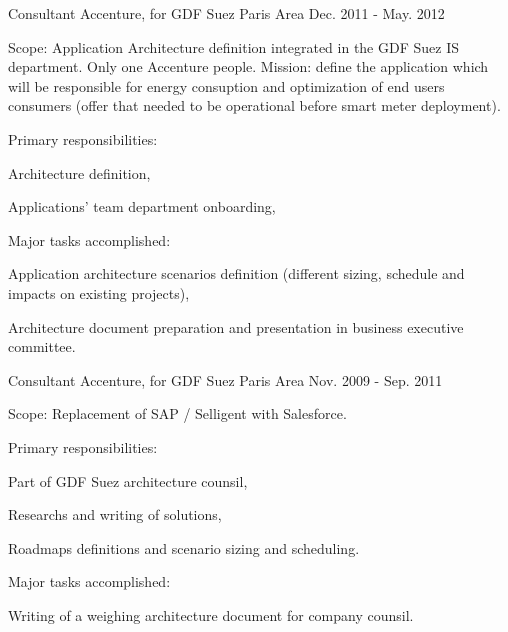 \begin{cventries}
  \cventry
    {Consultant} %
    {Accenture, for GDF Suez} %
    {Paris Area} %
    {Dec. 2011 - May. 2012} %
    {
      \begin{cvitems} %
        \item {Scope: Application Architecture definition integrated in the GDF Suez IS department. Only one Accenture people. Mission: define the application which will be responsible for energy consuption and optimization of end users consumers (offer that needed to be operational before smart meter deployment).}
        \item {Primary responsibilities:}
        \begin{cvsubitems}
          \item {Architecture definition,}
          \item {Applications' team department onboarding,}
        \end{cvsubitems}
        \item {Major tasks accomplished:}
        \begin{cvsubitems}
          \item {Application architecture scenarios definition (different sizing, schedule and impacts on existing projects),}
          \item {Architecture document preparation and presentation in business executive committee.}
        \end{cvsubitems}
      \end{cvitems}
    }

  \cventry
    {Consultant} %
    {Accenture, for GDF Suez} %
    {Paris Area} %
    {Nov. 2009 - Sep. 2011} %
    {
      \begin{cvitems} %
        \item {Scope: Replacement of SAP / Selligent with Salesforce.}
        \item {Primary responsibilities:}
        \begin{cvsubitems}
          \item {Part of GDF Suez architecture counsil,}
          \item {Researchs and writing of solutions,}
          \item {Roadmaps definitions and scenario sizing and scheduling.}
        \end{cvsubitems}
        \item {Major tasks accomplished:}
        \begin{cvsubitems}
          \item {Writing of a weighing architecture document for company counsil.}
        \end{cvsubitems}
      \end{cvitems}
    }


\end{cventries}
